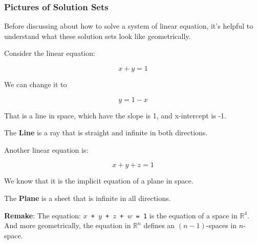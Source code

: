 \documentclass[a4paper,12pt]{article}
\begin{document}
\Large \subsubsection{Pictures of Solution Sets}
    \begin{frame}
        \small 
        
        \small Before discussing about how to solve a system of linear equation, it's helpful to understand what these solution sets look like geometrically.
        
        Consider the linear equation: 
        \begin{center}
            \begin{equation}
                x + y = 1
            \end{equation}            
        \end{center}
        
        We can change it to 
        \begin{center} \begin{equation} y = 1 - x \end{equation} \end{center}
        
        That is a line in space, which have the slope is 1, and x-intercept is -1.
        \begin{tcolorbox}[title=Line's Definition,colframe=blue!70!black, colback=blue!5!white]
        The \textbf{Line} is a ray that is straight and infinite in both directions.
        \end{tcolorbox}
        
        Another linear equation is:
        \begin{center}
            \begin{equation}
                x + y + z = 1
            \end{equation}
        \end{center}
        
        \text We know that it is the implicit equation of a plane in space.
        \begin{tcolorbox}[title=Plane's Definition,colframe=blue!70!black, colback=blue!5!white]
        The \textbf{Plane} is a  sheet that is infinite in all directions.\\
        \end{tcolorbox}
        \textbf{Remake}: The equation: \texttt{\(x\) + \(y\) + \(z\) + \(w\) = 1} is the equation of a space in \(\mathbb{R}^4\). And more geometrically, the equation in \(\mathbb{R}^n\) defines an \((n-1)\)-spaces in \(n\)-space.

    \end{frame}
\end{document}

